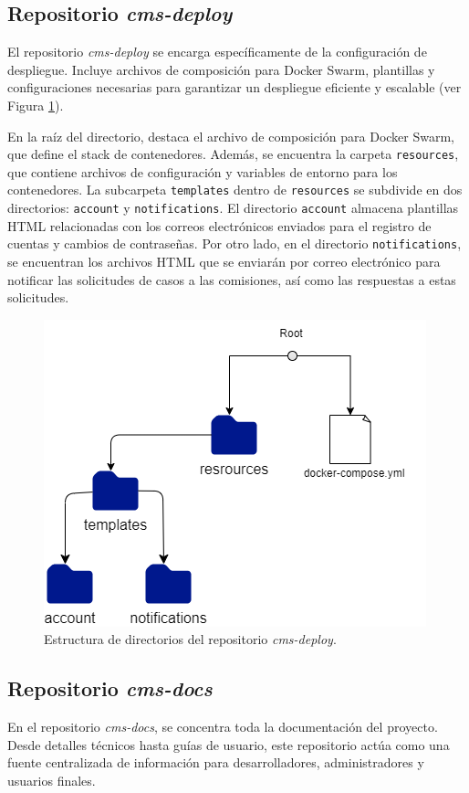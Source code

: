 \subsection{Repositorio \textit{cms-deploy}}\label{subsec:directory-deploy}

El repositorio \textit{cms-deploy} se encarga específicamente de la configuración de despliegue. Incluye archivos de composición para Docker Swarm, plantillas y configuraciones necesarias para garantizar un despliegue eficiente y escalable (ver Figura \ref{fig:deploy-directory}).


En la raíz del directorio, destaca el archivo de composición para Docker Swarm, que define el stack de contenedores. Además, se encuentra la carpeta \texttt{resources}, que contiene archivos de configuración y variables de entorno para los contenedores. La subcarpeta \texttt{templates} dentro de \texttt{resources} se subdivide en dos directorios: \texttt{account} y \texttt{notifications}. El directorio \texttt{account} almacena plantillas HTML relacionadas con los correos electrónicos enviados para el registro de cuentas y cambios de contraseñas. Por otro lado, en el directorio \texttt{notifications}, se encuentran los archivos HTML que se enviarán por correo electrónico para notificar las solicitudes de casos a las comisiones, así como las respuestas a estas solicitudes. 


\begin{figure}[H]
    \centering
    \includegraphics[width=0.5\linewidth]{fig/deploy-directory.png}
    \caption{Estructura de directorios del repositorio \textit{cms-deploy}.}
    \label{fig:deploy-directory}
\end{figure}

\subsection{Repositorio \textit{cms-docs}}

En el repositorio \textit{cms-docs}, se concentra toda la documentación del proyecto. Desde detalles técnicos hasta guías de usuario, este repositorio actúa como una fuente centralizada de información para desarrolladores, administradores y usuarios finales.

